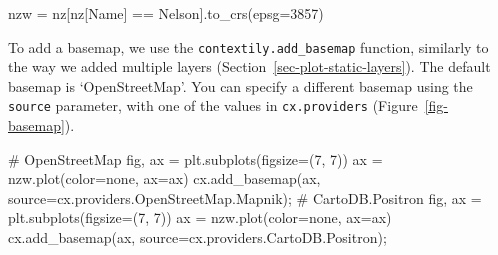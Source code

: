 \documentclass[
  letterpaper,
]{krantz}
\newenvironment{Shaded}{\begin{snugshade}}{\end{snugshade}}
\newcommand{\CommentTok}[1]{\textcolor[rgb]{0.37,0.37,0.37}{#1}}
\newcommand{\DecValTok}[1]{\textcolor[rgb]{0.68,0.00,0.00}{#1}}
\newcommand{\NormalTok}[1]{\textcolor[rgb]{0.00,0.23,0.31}{#1}}
\newcommand{\OperatorTok}[1]{\textcolor[rgb]{0.37,0.37,0.37}{#1}}
\newcommand{\StringTok}[1]{\textcolor[rgb]{0.13,0.47,0.30}{#1}}
\begin{document}
\begin{Shaded}
\begin{Highlighting}[]
\NormalTok{nzw }\OperatorTok{=}\NormalTok{ nz[nz[}\StringTok{\textquotesingle{}Name\textquotesingle{}}\NormalTok{] }\OperatorTok{==} \StringTok{\textquotesingle{}Nelson\textquotesingle{}}\NormalTok{].to\_crs(epsg}\OperatorTok{=}\DecValTok{3857}\NormalTok{)}
\end{Highlighting}
\end{Shaded}

To add a basemap, we use the \texttt{contextily.add\_basemap} function,
similarly to the way we added multiple layers
(Section~\ref{sec-plot-static-layers}). The default basemap is
`OpenStreetMap'. You can specify a different basemap using the
\texttt{source} parameter, with one of the values in
\texttt{cx.providers} (Figure~\ref{fig-basemap}).

\begin{Shaded}
\begin{Highlighting}[]
\CommentTok{\# OpenStreetMap}
\NormalTok{fig, ax }\OperatorTok{=}\NormalTok{ plt.subplots(figsize}\OperatorTok{=}\NormalTok{(}\DecValTok{7}\NormalTok{, }\DecValTok{7}\NormalTok{))}
\NormalTok{ax }\OperatorTok{=}\NormalTok{ nzw.plot(color}\OperatorTok{=}\StringTok{\textquotesingle{}none\textquotesingle{}}\NormalTok{, ax}\OperatorTok{=}\NormalTok{ax)}
\NormalTok{cx.add\_basemap(ax, source}\OperatorTok{=}\NormalTok{cx.providers.OpenStreetMap.Mapnik)}\OperatorTok{;}
\CommentTok{\# CartoDB.Positron}
\NormalTok{fig, ax }\OperatorTok{=}\NormalTok{ plt.subplots(figsize}\OperatorTok{=}\NormalTok{(}\DecValTok{7}\NormalTok{, }\DecValTok{7}\NormalTok{))}
\NormalTok{ax }\OperatorTok{=}\NormalTok{ nzw.plot(color}\OperatorTok{=}\StringTok{\textquotesingle{}none\textquotesingle{}}\NormalTok{, ax}\OperatorTok{=}\NormalTok{ax)}
\NormalTok{cx.add\_basemap(ax, source}\OperatorTok{=}\NormalTok{cx.providers.CartoDB.Positron)}\OperatorTok{;}
\end{Highlighting}
\end{Shaded}
\end{document}
